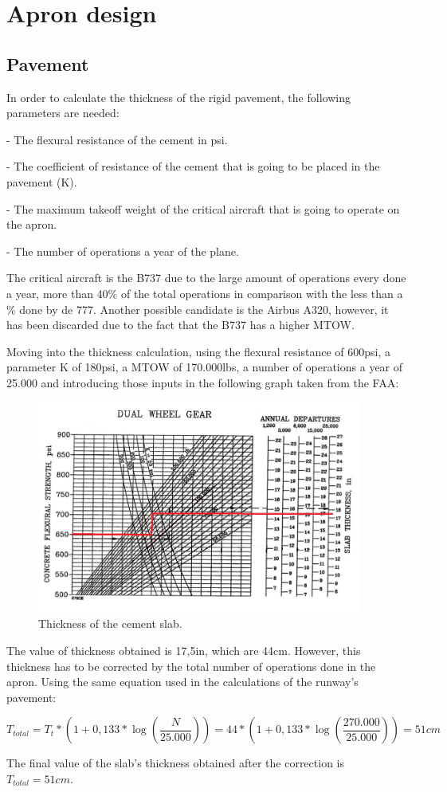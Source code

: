 \chapter{Apron design}
	\section{Pavement}
		In order to calculate the thickness of the rigid pavement, the following parameters are needed:
		
		- The flexural resistance of the cement in psi. 
		
		- The coefficient of resistance of the cement that is going to be placed in the pavement (K).
		
		- The maximum takeoff weight of the critical aircraft that is going to operate on the apron.
		
		- The number of operations a year of the plane.
		
		The critical aircraft is the B737 due to the large amount of operations every done a year, more than 40\% of the total operations in comparison with the less than a \% done by de 777. Another possible candidate is the Airbus A320, however, it has been discarded due to the fact that the B737 has a higher MTOW.
		
		Moving into the thickness calculation, using the flexural resistance of 600psi, a parameter K of 180psi, a MTOW of 170.000lbs, a number of operations a year of 25.000 and introducing those inputs in the following graph taken from the FAA: 
		
		\begin{figure}[H]
			\centering
			\includegraphics[clip, trim=0cm 0cm 0cm 0cm, width=0.95\textwidth]{./images/pavement/apron/thickness1}
			\caption{Thickness of the cement slab.}
			\label{} %
		\end{figure}
	
	The value of thickness obtained is 17,5in, which are 44cm. However, this thickness has to be corrected by the total number of operations done in the apron. Using the same equation used in the calculations of the runway's pavement:
	
	\[T_{total} = T_t * (1+0,133*\log(\dfrac{N}{25.000})) = 44 * (1+0,133*\log(\dfrac{270.000}{25.000}))= 51cm\]
	
	The final value of the slab's thickness obtained after the correction is \(T_{total}=51cm\).